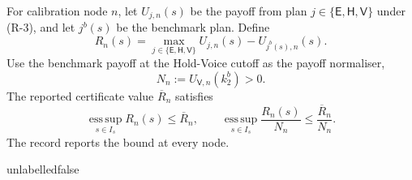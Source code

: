 \begin{proposition}
For calibration node $n$, let $U_{j,n}(s)$ be the payoff from plan
$j\in\{\mathsf{E},\mathsf{H},\mathsf{V}\}$ under (R-3), and let $j^b(s)$ be the benchmark plan. Define
\begin{equation}
\label{eq:regret-definition}
R_n(s)=\max_{j\in\{\mathsf{E},\mathsf{H},\mathsf{V}\}}U_{j,n}(s)-U_{j^b(s),n}(s).
\end{equation}
Use the benchmark payoff at the Hold-Voice cutoff as the payoff normaliser,
\begin{equation}
\label{eq:regret-normaliser}
N_n:=U_{\mathsf{V},n}(k_2^b)>0.
\end{equation}
The reported certificate value $\overline R_n$ satisfies
\begin{equation}
\label{eq:regret-bound}
\operatorname*{ess\,sup}_{s\in I_s}R_n(s)\le\overline R_n,
\qquad
\operatorname*{ess\,sup}_{s\in I_s}\frac{R_n(s)}{N_n}
\le\frac{\overline R_n}{N_n}.
\end{equation}
The record reports the bound at every node.
\end{proposition}
\csname unlabelledfalse\endcsname

